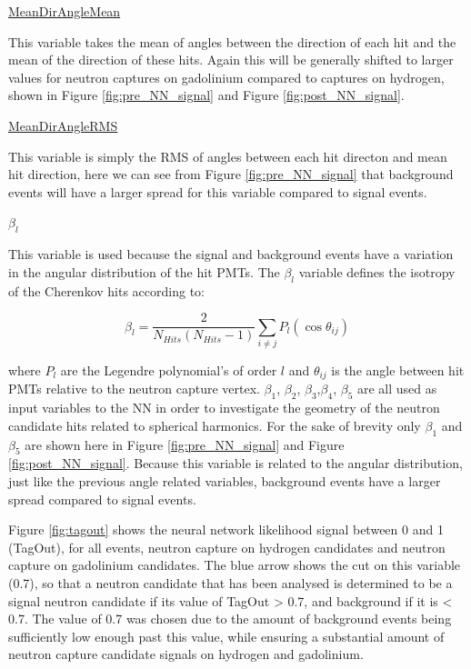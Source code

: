 \underline{MeanDirAngleMean}

This variable takes the mean of angles between the direction of each hit and the mean of the direction of these hits. Again this will be generally shifted to larger values for neutron captures on gadolinium compared to captures on hydrogen, shown in Figure \ref{fig:pre_NN_signal} and Figure \ref{fig:post_NN_signal}. 

\underline{MeanDirAngleRMS}

This variable is simply the RMS of angles between each hit directon and mean hit direction, here we can see from Figure \ref{fig:pre_NN_signal} that background events will have a larger spread for this variable compared to signal events. 



\underline{$\beta_{l}$}

This variable is used because the signal and background events have a variation in the angular distribution of the hit PMTs. 
The $\beta_{l}$ variable defines the isotropy of the Cherenkov hits according to:

\begin{equation}
    \beta_{l}=\frac{2}{N_{H i t s}\left(N_{H i t s}-1\right)} \sum_{i \neq j} P_l\left(\cos \theta_{i j}\right)
\end{equation}

where $P_{l}$ are the Legendre polynomial's of order $l$ and $\theta_{ij}$ is the angle between hit PMTs relative to the neutron capture vertex. $\beta_{1}$, $\beta_{2}$, $\beta_{3}$,$\beta_{4}$, $\beta_{5}$ are all used as input variables to the NN in order to investigate the geometry of the neutron candidate hits related to spherical harmonics. For the sake of brevity only $\beta_{1}$ and $\beta_{5}$ are shown here in Figure \ref{fig:pre_NN_signal} and Figure \ref{fig:post_NN_signal}. Because this variable is related to the angular distribution, just like the previous angle related variables, background events have a larger spread compared to signal events.




Figure \ref{fig:tagout} shows the neural network likelihood signal between 0 and 1 (TagOut), for all events, neutron capture on hydrogen candidates and neutron capture on gadolinium candidates. The blue arrow shows the cut on this variable (0.7), so that a neutron candidate that has been analysed is determined to be a signal neutron candidate if its value of TagOut > 0.7, and background if it is < 0.7. The value of 0.7 was chosen due to the amount of background events being sufficiently low enough past this value, while ensuring a substantial amount of neutron capture candidate signals on hydrogen and gadolinium.

